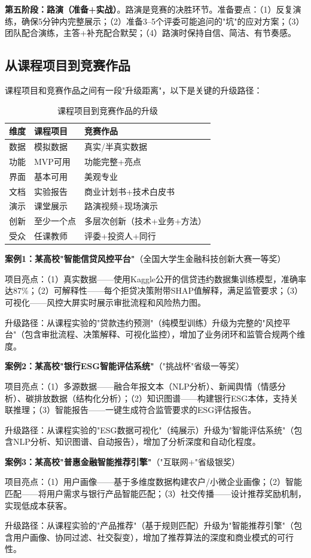 \textbf{第五阶段：路演（准备+实战）}。路演是竞赛的决胜环节。准备要点：（1）反复演练，确保5分钟内完整展示；（2）准备3--5个评委可能追问的"坑"的应对方案；（3）团队配合演练，主答+补充配合默契；（4）路演时保持自信、简洁、有节奏感。

\subsection{从课程项目到竞赛作品}

课程项目和竞赛作品之间有一段"升级距离"，以下是关键的升级路径：

\begin{table}[H]
\centering
\small
\begin{tabular}{lll}
\toprule
\textbf{维度} & \textbf{课程项目} & \textbf{竞赛作品} \\
\midrule
数据 & 模拟数据 & 真实/半真实数据 \\
功能 & MVP可用 & 功能完整+亮点 \\
界面 & 基本可用 & 美观专业 \\
文档 & 实验报告 & 商业计划书+技术白皮书 \\
演示 & 课堂展示 & 路演视频+现场演示 \\
创新 & 至少一个点 & 多层次创新（技术+业务+方法） \\
受众 & 任课教师 & 评委+投资人+同行 \\
\bottomrule
\end{tabular}
\caption{课程项目到竞赛作品的升级}
\end{table}

\begin{casebox}[往届获奖项目分析]
\textbf{案例1：某高校"智能信贷风控平台"}（全国大学生金融科技创新大赛一等奖）

项目亮点：（1）真实数据——使用Kaggle公开的信贷违约数据集训练模型，准确率达87\%；（2）可解释性——每个拒贷决策附带SHAP值解释，满足监管要求；（3）可视化——风控大屏实时展示审批流程和风险热力图。

升级路径：从课程实验的"贷款违约预测"（纯模型训练）升级为完整的"风控平台"（包含审批流程、决策解释、可视化监控），增加了业务闭环和监管合规两个维度。

\textbf{案例2：某高校"银行ESG智能评估系统"}（"挑战杯"省级一等奖）

项目亮点：（1）多源数据——融合年报文本（NLP分析）、新闻舆情（情感分析）、碳排放数据（结构化分析）；（2）知识图谱——构建银行ESG本体，支持关联推理；（3）智能报告——一键生成符合监管要求的ESG评估报告。

升级路径：从课程实验的"ESG数据可视化"（纯展示）升级为"智能评估系统"（包含NLP分析、知识图谱、自动报告），增加了分析深度和自动化程度。

\textbf{案例3：某高校"普惠金融智能推荐引擎"}（"互联网+"省级银奖）

项目亮点：（1）用户画像——基于多维度数据构建农户/小微企业画像；（2）智能匹配——将用户需求与银行产品智能匹配；（3）社交传播——设计推荐奖励机制，实现低成本获客。

升级路径：从课程实验的"产品推荐"（基于规则匹配）升级为"智能推荐引擎"（包含用户画像、协同过滤、社交裂变），增加了推荐算法的深度和商业模式的可行性。
\end{casebox}

